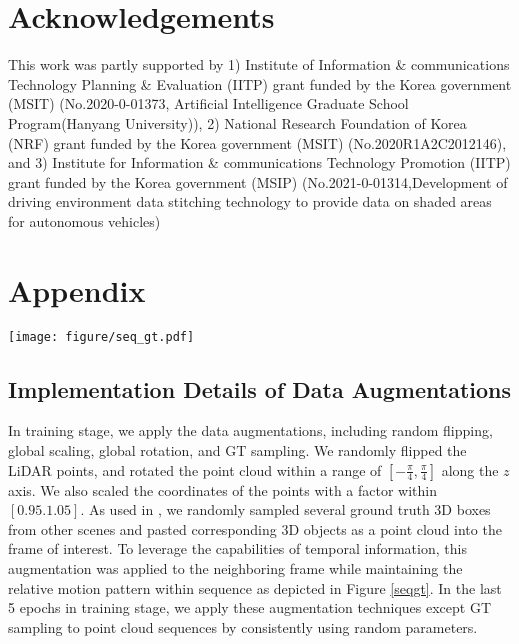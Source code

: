 \documentclass[letterpaper]{article} \usepackage{aaai23}  \usepackage{times}  \usepackage{helvet}  \usepackage{courier}  \usepackage[hyphens]{url}  \usepackage{graphicx} \urlstyle{rm} \def\UrlFont{\rm}  \usepackage{natbib}  \usepackage{caption} \frenchspacing  \setlength{\pdfpagewidth}{8.5in} \usepackage{algorithm}
\begin{document}
\newpage

\section{Acknowledgements}
This work was partly supported by 1) Institute of Information \& communications Technology Planning \& Evaluation (IITP) grant funded by the Korea government (MSIT) (No.2020-0-01373, Artificial Intelligence Graduate School Program(Hanyang University)), 2) National Research Foundation of Korea (NRF) grant funded by the Korea government (MSIT) (No.2020R1A2C2012146), and 3) Institute for Information \& communications Technology Promotion (IITP) grant funded by the Korea government (MSIP) (No.2021-0-01314,Development of driving environment data stitching technology to provide data on shaded areas for autonomous vehicles)



\newpage

\onecolumn
\renewcommand{\thesection}{\Alph{section}}
\setcounter{figure}{0}
\setcounter{table}{0}
\section{Appendix}
\begin{figure*}[h]
    \centerline{\texttt{[image: figure/seq\_gt.pdf]}}
	\caption {\textbf{Visualization of GT sampling.} We implement GT sampling by keeping relative motion of objects within sequence.}
	\label{seqgt}
\end{figure*}
\subsection{Implementation Details of Data Augmentations}
In training stage, we apply the data augmentations, including random flipping, global scaling, global rotation, and GT sampling\cite{second}. We randomly flipped the LiDAR points, and rotated the point cloud within a range of $[-\frac{\pi}{4},\frac{\pi}{4}]$ along the $z$ axis. We also scaled the coordinates of the points with a factor within $[0.95.1.05]$. 
As used in \cite{second}, we randomly sampled several ground truth 3D boxes from other scenes and pasted corresponding 3D objects as a point cloud into the frame of interest. To leverage the capabilities of temporal information, this augmentation was applied to the neighboring frame while maintaining the relative motion pattern within sequence as depicted in Figure \ref{seqgt}.
In the last 5 epochs in training stage, we apply these augmentation techniques except GT sampling to point cloud sequences by consistently using random parameters.
\end{document}
